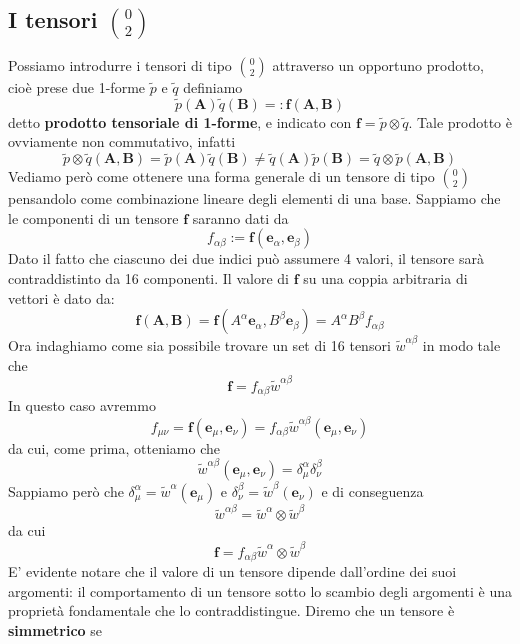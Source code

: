 \documentclass[a4paper,11pt]{book}
\theoremstyle{plain}
\theoremstyle{definition}
\begin{document}
\subsection{I tensori $\binom{0}{2}$}
Possiamo introdurre i tensori di tipo $\binom{0}{2}$ attraverso un opportuno prodotto, cioè prese due 1-forme $\tilde{p}$ e $\tilde{q}$ definiamo
\[
\tilde{p}(\textbf{A})\tilde{q}(\textbf{B}) =: \textbf{f}(\textbf{A},\textbf{B})
\]
detto \textbf{prodotto tensoriale di 1-forme}, e indicato con $\textbf{f}=\tilde{p}\otimes \tilde{q}$. Tale prodotto è ovviamente non commutativo, infatti
\[
\tilde{p}\otimes\tilde{q}(\textbf{A},\textbf{B}) = \tilde{p}(\textbf{A})\tilde{q}(\textbf{B}) \not= \tilde{q}(\textbf{A})\tilde{p}(\textbf{B})=\tilde{q}\otimes\tilde{p}(\textbf{A},\textbf{B})
\]
Vediamo però come ottenere una forma generale di un tensore di tipo $\binom{0}{2}$ pensandolo come combinazione lineare degli elementi di una base. Sappiamo che le componenti di un tensore $\textbf{f}$ saranno dati da
\[
f_{\alpha\beta} := \textbf{f}(\textbf{e}_{\alpha},\textbf{e}_{\beta})
\]
Dato il fatto che ciascuno dei due indici può assumere 4 valori, il tensore sarà contraddistinto da 16 componenti. Il valore di $\textbf{f}$ su una coppia arbitraria di vettori è dato da:
\[
\textbf{f}(\textbf{A},\textbf{B}) = \textbf{f}(A^{\alpha}\textbf{e}_{\alpha},B^{\beta}\textbf{e}_{\beta})=A^{\alpha}B^{\beta}f_{\alpha\beta}
\]
Ora indaghiamo come sia possibile trovare un set di 16 tensori $\tilde{w}^{\alpha\beta}$ in modo tale che
\[
\textbf{f}=f_{\alpha\beta}\tilde{w}^{\alpha\beta}
\]
In questo caso avremmo
\[
f_{\mu\nu}=\textbf{f}(\textbf{e}_{\mu},\textbf{e}_{\nu})=f_{\alpha\beta}\tilde{w}^{\alpha\beta}(\textbf{e}_{\mu},\textbf{e}_{\nu})
\]
da cui, come prima, otteniamo che
\[
\tilde{w}^{\alpha\beta}(\textbf{e}_{\mu},\textbf{e}_{\nu})=\delta^{\alpha}_{\mu}\delta^{\beta}_{\nu}
\]
Sappiamo però che $\delta^{\alpha}_{\mu}=\tilde{w}^{\alpha}(\textbf{e}_{\mu})$ e $\delta^{\beta}_{\nu}=\tilde{w}^{\beta}(\textbf{e}_{\nu})$ e di conseguenza
\begin{equation}\label{eq:2form1}
\tilde{w}^{\alpha\beta}=\tilde{w}^{\alpha}\otimes \tilde{w}^{\beta}
\end{equation}
da cui
\begin{equation}\label{eq:2form2}
\textbf{f}=f_{\alpha\beta}\tilde{w}^{\alpha}\otimes \tilde{w}^{\beta}
\end{equation}
E' evidente notare che il valore di un tensore dipende dall'ordine dei suoi argomenti: il comportamento di un tensore sotto lo scambio degli argomenti è una proprietà fondamentale che lo contraddistingue. Diremo che un tensore è \textbf{simmetrico} se 
\end{document}

